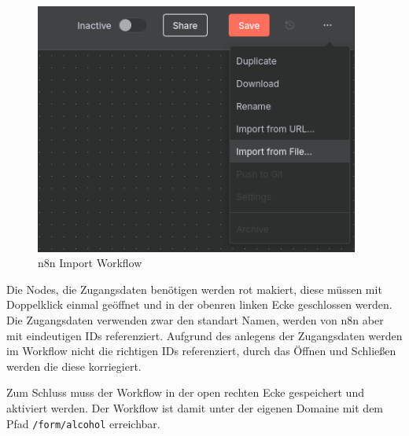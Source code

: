 \begin{figure}
    \begin{center}
        \includegraphics[width=0.95\textwidth]{images/n8n_import.png}
    \end{center}
    \caption{n8n Import Workflow}\label{fig:n8n_import}
\end{figure}

Die Nodes, die Zugangsdaten benötigen werden rot makiert, diese müssen mit Doppelklick einmal
geöffnet und in der obenren linken Ecke geschlossen werden. Die Zugangsdaten verwenden zwar den
standart Namen, werden von n8n aber mit eindeutigen IDs referenziert. Aufgrund des anlegens der
Zugangsdaten werden im Workflow nicht die richtigen IDs referenziert, durch das Öffnen und Schließen
werden die diese korriegiert.

Zum Schluss muss der Workflow in der open rechten Ecke gespeichert und aktiviert werden. Der
Workflow ist damit unter der eigenen Domaine mit dem Pfad \verb|/form/alcohol| erreichbar.
